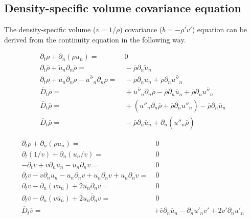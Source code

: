 \documentclass[10pt,paper=a4]{report}
\newcommand{\eht}{\overline}
\newcommand{\fht}{\widetilde}
\begin{document}
\newpage

\fontsize{12pt}{20pt}

\subsection{Density-specific volume covariance equation}

The density-specific volume ($v = 1/\rho$) covariance ($b = -\eht{\rho' v'}$) equation can be derived from the continuity equation in the following way. 

\fontsize{9pt}{20pt}

\begin{align}
\partial_t \rho + \partial_n (\rho u_n) = & \ 0 \\
\partial_t \eht{\rho} + \fht{u}_n \partial_n \eht{\rho} = & \ -\eht{\rho} \partial_n \fht{u}_n \\
\partial_t \eht{\rho} + \eht{u}_n \partial_n \eht{\rho} - \eht{u''_n} \partial_n \eht{\rho} = & \ - \eht{\rho}\partial_n \eht{u}_n + \eht{\rho} \partial_n \eht{u''_n} \\
\eht{D}_t \eht{\rho} = & \ +\overline{u''_n} \partial_n \eht{\rho} - \eht{\rho} \partial_n \eht{u}_n + \eht{\rho} \partial_n \eht{u''_n} \\
\eht{D}_t \eht{\rho} = & \ +( \overline{u''_n} \partial_n \eht{\rho} +  \eht{\rho} \partial_n \eht{u''_n} ) - \eht{\rho} \partial_n \eht{u}_n \\
\eht{D}_t \eht{\rho} = & \ - \eht{\rho} \partial_n \eht{u}_n + \partial_n ( \overline{u''_n} \eht{\rho} )
\end{align}

\begin{align}
\partial_t \rho + \partial_n (\rho u_n) = & \ 0 \\
\partial_t (1/v) + \partial_n (u_n / v) = & \ 0 \\
-\partial_t v + v\partial_n u_n - u_n\partial_n v = & \ 0 \\
\partial_t v - v\partial_n u_n - u_n\partial_n v + u_n\partial_n v + u_n\partial_n v = & \ 0 \\
\partial_t v - \partial_n (v u_n) + 2 u_n \partial_n v = & \ 0 \\
\partial_t \eht{v} - \partial_n (\eht{v u_n}) + 2 \eht{u_n \partial_n v} = & \ 0 \\
\eht{D}_t \eht{v} = & +\eht{v}\partial_n \eht{u}_n - \partial_n \eht{u'_n v'} + 2 \eht{v'\partial_n u'_n}  
\end{align}
\end{document}
